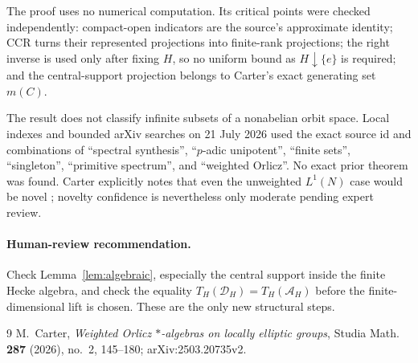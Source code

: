 \documentclass[11pt]{article}
\newcommand{\A}{\mathcal A}
\newcommand{\D}{\mathcal D}
\begin{document}
The proof uses no numerical computation.  Its critical points were checked
independently: compact-open indicators are the source's approximate identity;
CCR turns their represented projections into finite-rank projections; the
right inverse is used only after fixing $H$, so no uniform bound as
$H\downarrow\{e\}$ is required; and the central-support projection belongs
to Carter's exact generating set $m(C)$.

The result does not classify infinite subsets of a nonabelian orbit space.
Local indexes and bounded arXiv searches on 21 July 2026 used the exact source
id and combinations of ``spectral synthesis'', ``$p$-adic unipotent'',
``finite sets'', ``singleton'', ``primitive spectrum'', and ``weighted
Orlicz''.  No exact prior theorem was found.  Carter explicitly notes that
even the unweighted $L^1(N)$ case would be novel \cite[Section 8.3]{Carter};
novelty confidence is nevertheless only moderate pending expert review.

\paragraph{Human-review recommendation.}
Check Lemma~\ref{lem:algebraic}, especially the central support inside the
finite Hecke algebra, and check the equality
$T_H(\D_H)=T_H(\A_H)$ before the finite-dimensional lift is chosen.  These
are the only new structural steps.

\begin{thebibliography}{9}
M.~Carter,
\emph{Weighted Orlicz $*$-algebras on locally elliptic groups},
Studia Math. \textbf{287} (2026), no.~2, 145--180;
arXiv:2503.20735v2.
\end{thebibliography}
\end{document}
